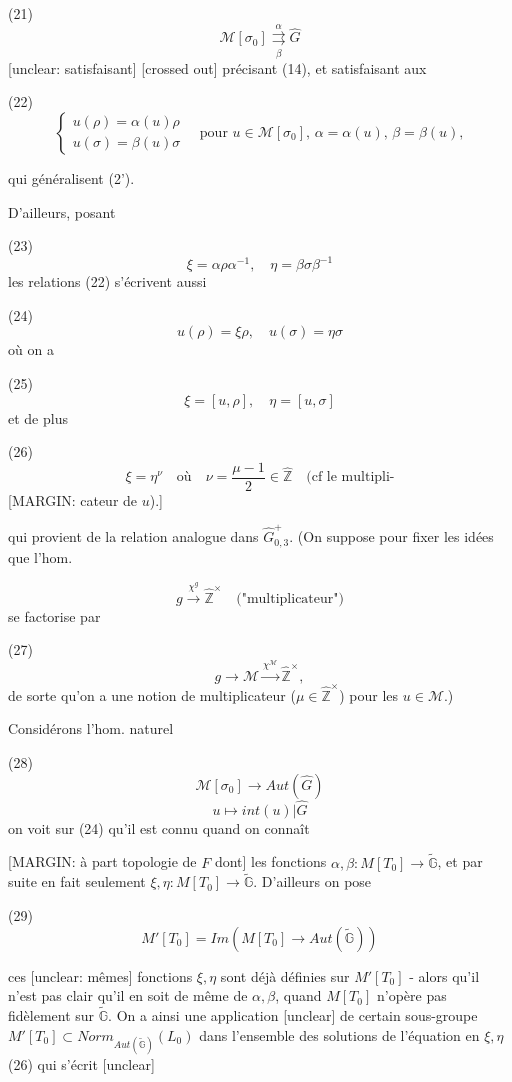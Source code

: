 \newpage


(21) 
$$ \mathcal{M}[\sigma_0] \overset{\alpha}{\underset{\beta}{\rightrightarrows}} \hat{G} $$
[unclear: satisfaisant] [crossed out]
précisant (14), et satisfaisant aux

(22)
$$ \begin{cases} u(\rho) = \alpha(u) \rho \\ u(\sigma) = \beta(u) \sigma \end{cases} \quad \text{pour } u \in \mathcal{M}[\sigma_0], \, \alpha = \alpha(u), \, \beta = \beta(u) , $$

qui généralisent (2').

D'ailleurs, posant

(23)
$$ \xi = \alpha \rho \alpha^{-1}, \quad \eta = \beta \sigma \beta^{-1} $$
les relations (22) s'écrivent aussi

(24)
$$ u(\rho) = \xi \rho, \quad u(\sigma) = \eta \sigma $$
où on a

(25)
$$ \xi = [u, \rho], \quad \eta = [u, \sigma] $$
et de plus

(26)
$$ \xi = \eta^\nu \quad \text{où} \quad \nu = \frac{\mu - 1}{2} \in \hat{\mathbb{Z}} \quad \text{(cf le multipli-} $$
[MARGIN: cateur de $u$).]

qui provient de la relation analogue dans $\hat{G}_{0,3}^+$.
(On suppose pour fixer les idées que
l'hom.

$$ g \xrightarrow{\chi^g} \hat{\mathbb{Z}}^\times \quad \text{("multiplicateur")} $$
se factorise par

(27)
$$ g \rightarrow \mathcal{M} \xrightarrow{\chi^\mathcal{M}} \hat{\mathbb{Z}}^\times , $$
de sorte qu'on a une notion de multiplicateur ($\mu \in \hat{\mathbb{Z}}^\times$)
pour les $u \in \mathcal{M}$.)

Considérons l'hom. naturel

(28)
$$ \mathcal{M}[\sigma_0] \rightarrow Aut(\hat{G}) $$
$$ u \mapsto int(u) | \hat{G} $$
on voit sur (24) qu'il est connu quand on connaît

\newpage


[MARGIN: à part topologie de $F$ dont] les fonctions $\alpha, \beta : M[T_0] \to \tilde{\mathbb{G}}$, et par suite
en fait seulement $\xi, \eta : M[T_0] \to \tilde{\mathbb{G}}$.
D'ailleurs on pose

(29) $$M'[T_0] = Im(M[T_0] \to Aut(\tilde{\mathbb{G}}))$$

ces [unclear: mêmes] fonctions $\xi, \eta$ sont déjà définies sur
$M'[T_0]$ - alors qu'il n'est pas clair qu'il en soit
de même de $\alpha, \beta$, quand $M[T_0]$ n'opère pas fidèlement
sur $\tilde{\mathbb{G}}$. On a ainsi une application [unclear] de
certain sous-groupe $M'[T_0] \subset Norm_{Aut(\tilde{\mathbb{G}})}(L_0)$ dans
l'ensemble des solutions de l'équation en $\xi, \eta$
(26) qui s'écrit [unclear]

